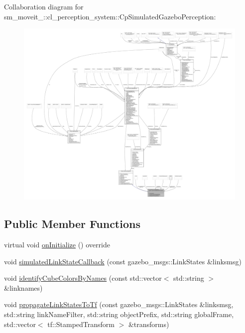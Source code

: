 Collaboration diagram for sm\+\_\+moveit\+\_\+:\+:cl\+\_\+perception\+\_\+system\+:\+:Cp\+Simulated\+Gazebo\+Perception\+:
\nopagebreak
\begin{figure}[H]
\begin{center}
\leavevmode
\includegraphics[width=350pt]{classsm__moveit__4_1_1cl__perception__system_1_1CpSimulatedGazeboPerception__coll__graph}
\end{center}
\end{figure}
\subsection*{Public Member Functions}
\begin{DoxyCompactItemize}
\item 
virtual void \hyperlink{classsm__moveit__4_1_1cl__perception__system_1_1CpSimulatedGazeboPerception_adebc30f6b1fc905f783de3f7bdf4a711}{on\+Initialize} () override
\item 
void \hyperlink{classsm__moveit__4_1_1cl__perception__system_1_1CpSimulatedGazeboPerception_a7914ffd20518c866a8a1e11254589d12}{simulated\+Link\+State\+Callback} (const gazebo\+\_\+msgs\+::\+Link\+States \&linksmsg)
\item 
void \hyperlink{classsm__moveit__4_1_1cl__perception__system_1_1CpSimulatedGazeboPerception_aac02fd742b0074f62d8909ce00a02d3b}{identify\+Cube\+Colors\+By\+Names} (const std\+::vector$<$ std\+::string $>$ \&linknames)
\item 
void \hyperlink{classsm__moveit__4_1_1cl__perception__system_1_1CpSimulatedGazeboPerception_a643fa78620216085ca385b74832a0abc}{propagate\+Link\+States\+To\+Tf} (const gazebo\+\_\+msgs\+::\+Link\+States \&linksmsg, std\+::string link\+Name\+Filter, std\+::string object\+Prefix, std\+::string global\+Frame, std\+::vector$<$ tf\+::\+Stamped\+Transform $>$ \&transforms)
\end{DoxyCompactItemize}
